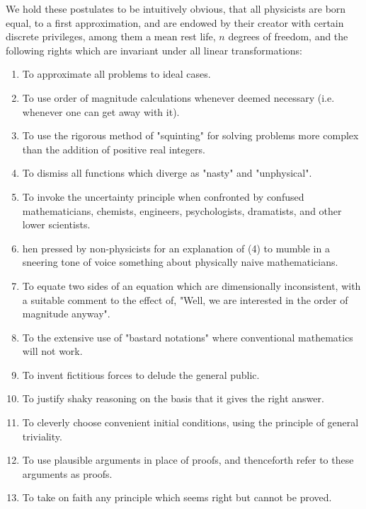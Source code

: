 We hold these postulates to be intuitively obvious, that all physicists are born equal, to a first approximation, and are endowed by their creator with certain discrete privileges, among them a mean rest life, $n$ degrees of freedom, and the following rights which are invariant under all linear transformations:
\begin{enumerate}
	\item To approximate all problems to ideal cases.

	\item To use order of magnitude calculations whenever deemed necessary (i.e. whenever one can get away with it).

	\item To use the rigorous method of "squinting" for solving problems more complex than the addition of positive real integers.

	\item To dismiss all functions which diverge as "nasty" and "unphysical".

	\item To invoke the uncertainty principle when confronted by confused mathematicians, chemists, engineers, psychologists, dramatists, and other lower scientists.

	\item hen pressed by non-physicists for an explanation of (4) to mumble in a sneering tone of voice something about physically naive mathematicians.

	\item To equate two sides of an equation which are dimensionally inconsistent, with a suitable comment to the effect of, "Well, we are interested in the order of magnitude anyway".

	\item To the extensive use of "bastard notations" where conventional mathematics will not work.

	\item To invent fictitious forces to delude the general public. 

	\item To justify shaky reasoning on the basis that it gives the right answer.

	\item To cleverly choose convenient initial conditions, using the principle of general triviality.

	\item To use plausible arguments in place of proofs, and thenceforth refer to these arguments as proofs.

	\item To take on faith any principle which seems right but cannot be proved.
\end{enumerate}

